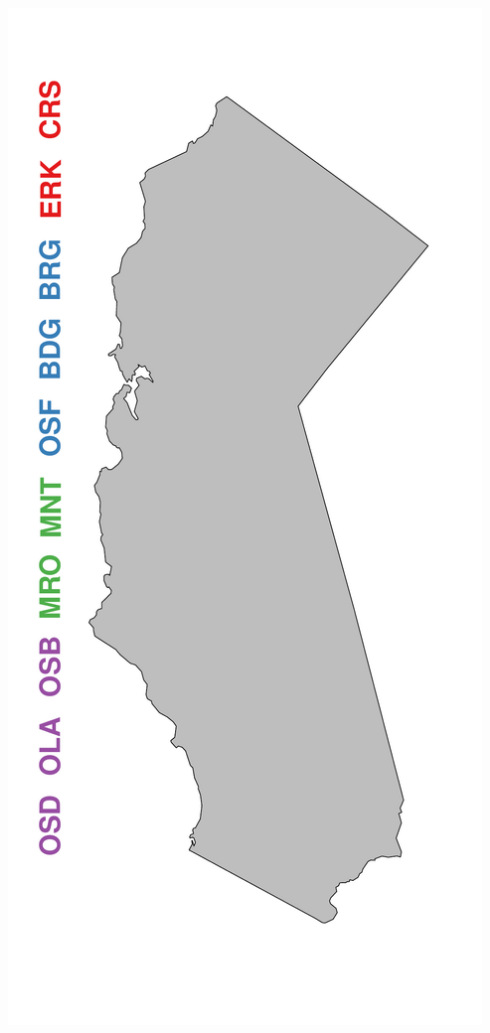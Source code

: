 \documentclass[a0paper,portrait]{baposter}
\begin{document}
\begin{poster}
{\begin{minipage}[h!]{0.19\textwidth}
	        \includegraphics[width=0.94\textwidth]{../pictures/mapFullConcMend.pdf}
	\end{minipage}	
	\begin{minipage}[h!]{0.19\textwidth}
	        \hspace*{0.5cm}                %

\end{minipage}}
\end{poster}
\end{document}
